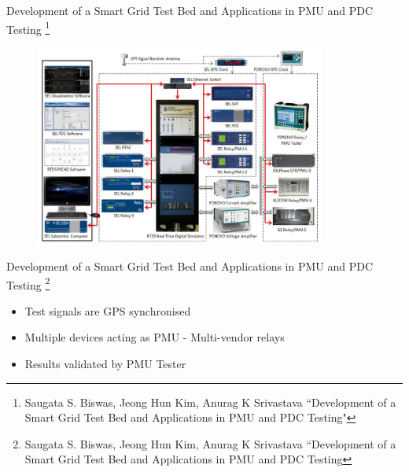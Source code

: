 \documentclass{beamer}
\begin{document}
\begin{frame}{{Development of a Smart Grid Test Bed and Applications in PMU and PDC Testing} \footnote{\tiny Saugata S. Biswas, Jeong Hun Kim, Anurag K Srivastava ``Development of a Smart Grid Test Bed and Applications in PMU and PDC Testing"} }
\begin{figure}
\includegraphics[width=0.85\textwidth]{fig/smart_test_bench.png}
\end{figure}
\end{frame}


\begin{frame}{Development of a Smart Grid Test Bed and Applications in PMU and PDC Testing \footnote{\tiny Saugata S. Biswas, Jeong Hun Kim, Anurag K Srivastava “Development of a Smart Grid Test Bed and Applications in PMU and PDC Testing} }
\begin{itemize}
\item Test signals are GPS synchronised
\item Multiple devices acting as PMU - Multi-vendor relays
\item Results validated by PMU Tester
\end{itemize}
\end{frame}   
\end{document}
